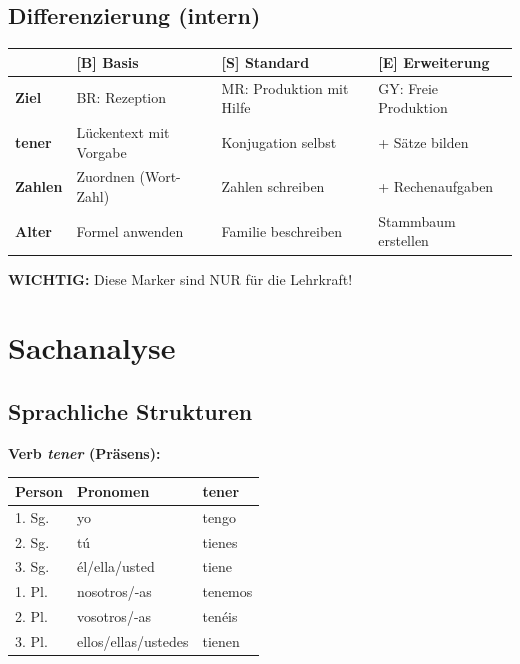 \documentclass[11pt,a4paper]{article}
\newcommand{\B}{\textcolor{basis}{\textbf{[B]}}}
\newcommand{\Std}{\textcolor{standard}{\textbf{[S]}}}
\newcommand{\E}{\textcolor{erweiterung}{\textbf{[E]}}}
\begin{document}
\subsection{Differenzierung (intern)}
\begin{tabular}{|l|p{3.5cm}|p{3.5cm}|p{3.5cm}|}
\hline
& \B{} \textbf{Basis} & \Std{} \textbf{Standard} & \E{} \textbf{Erweiterung} \\
\hline
\textbf{Ziel} & BR: Rezeption & MR: Produktion mit Hilfe & GY: Freie Produktion \\
\hline
\textbf{tener} & Lückentext mit Vorgabe & Konjugation selbst & + Sätze bilden \\
\hline
\textbf{Zahlen} & Zuordnen (Wort-Zahl) & Zahlen schreiben & + Rechenaufgaben \\
\hline
\textbf{Alter} & Formel anwenden & Familie beschreiben & Stammbaum erstellen \\
\hline
\end{tabular}

\vspace{0.5em}
\textbf{WICHTIG:} Diese Marker sind NUR für die Lehrkraft!

\section{Sachanalyse}

\subsection{Sprachliche Strukturen}

\textbf{Verb \textit{tener} (Präsens):}
\begin{center}
\begin{tabular}{|l|l|l|}
\hline
\textbf{Person} & \textbf{Pronomen} & \textbf{tener} \\
\hline
1. Sg. & yo & tengo \\
2. Sg. & tú & tienes \\
3. Sg. & él/ella/usted & tiene \\
1. Pl. & nosotros/-as & tenemos \\
2. Pl. & vosotros/-as & tenéis \\
3. Pl. & ellos/ellas/ustedes & tienen \\
\hline
\end{tabular}
\end{center}
\end{document}
